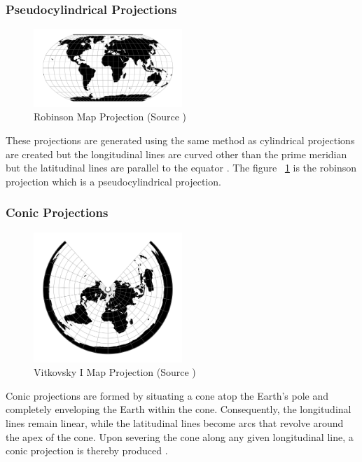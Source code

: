 \subsubsection{Pseudocylindrical Projections}

\begin{figure}[H]
    \centering
    \includegraphics[width=0.5\textwidth]{figures/chapter-1/robinson.png}
    \caption{Robinson Map Projection (Source \cite{PROJ_SITE})}
    \label{fig:robinson-image}
\end{figure}


These projections are generated using the same method as cylindrical projections are created but the longitudinal lines are curved other than the prime meridian but the latitudinal lines are parallel to the equator \cite{GISGEO_Cylinder}.
The figure ~\ref{fig:robinson-image} is the robinson projection which is a pseudocylindrical projection.

\subsubsection{Conic Projections}

\begin{figure}[H]
    \centering
    \includegraphics[width=0.5\textwidth]{figures/chapter-3/vitk1.png}
    \caption{Vitkovsky I Map Projection (Source \cite{PROJ_SITE})}
    \label{fig:vitkovsky-image}
\end{figure}
Conic projections are formed by situating a cone atop the Earth's pole and completely enveloping the Earth within the cone. Consequently, the longitudinal lines remain linear, while the latitudinal lines become arcs that revolve around the apex of the cone. Upon severing the cone along any given longitudinal line, a conic projection is thereby produced \cite{Snyder1982}.

